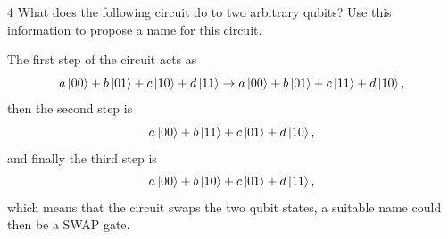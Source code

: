 \documentclass[11pt]{article}
\begin{document}
\begin{problem}{4}
  What does the following circuit do to two arbitrary qubits?
  Use this information to propose a name for this circuit.
  \begin{center}
  \end{center}
\end{problem}
\begin{answer}
  The first step of the circuit acts as
  \begin{equation}
  \label{eq:3}
  a\ket{00} + b\ket{01} + c\ket{10} + d\ket{11} \rightarrow a\ket{00} + b\ket{01} + c\ket{11} + d\ket{10},
\end{equation}
then the second step is
\begin{equation}
\label{eq:4}
a\ket{00} + b\ket{11} + c\ket{01} + d\ket{10},
\end{equation}
and finally the third step is
\begin{equation}
\label{eq:5}
a\ket{00} + b\ket{10} + c\ket{01} + d\ket{11},
\end{equation}
which means that the circuit swaps the two qubit states, a suitable name could then be a SWAP gate.
\end{answer}
\end{document}
